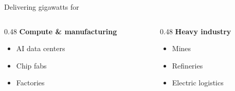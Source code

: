 
\begin{frame}{Delivering gigawatts for}
  \begin{columns}[T,onlytextwidth]
    \begin{column}{0.48\textwidth}
      \textbf{Compute \& manufacturing}
      \begin{itemize}
        \setlength{\itemsep}{0.45em}
        \item AI data centers
        \item Chip fabs
        \item Factories
      \end{itemize}
    \end{column}
    \begin{column}{0.48\textwidth}
      \textbf{Heavy industry}
      \begin{itemize}
        \setlength{\itemsep}{0.45em}
        \item Mines
        \item Refineries
        \item Electric logistics
      \end{itemize}
    \end{column}
  \end{columns}
\end{frame}
